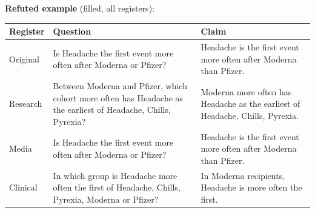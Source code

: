 \documentclass[11pt]{article}
\begin{document}
\vspace{3pt}
\textbf{Refuted example} (filled, all registers): \\
\begin{tabularx}{\linewidth}{@{}l L L@{}}
\toprule
\textbf{Register} & \textbf{Question} & \textbf{Claim} \\
\midrule
Original & Is Headache the first event more often after Moderna or Pfizer? & Headache is the first event more often after Moderna than Pfizer. \\
Research & Between Moderna and Pfizer, which cohort more often has Headache as the earliest of Headache, Chills, Pyrexia? & Moderna more often has Headache as the earliest of Headache, Chills, Pyrexia. \\
Media & Is Headache the first event more often after Moderna or Pfizer? & Headache is the first event more often after Moderna than Pfizer. \\
Clinical & In which group is Headache more often the first of Headache, Chills, Pyrexia, Moderna or Pfizer? & In Moderna recipients, Headache is more often the first. \\
\bottomrule
\end{tabularx}
\vspace{3pt}
\end{document}
